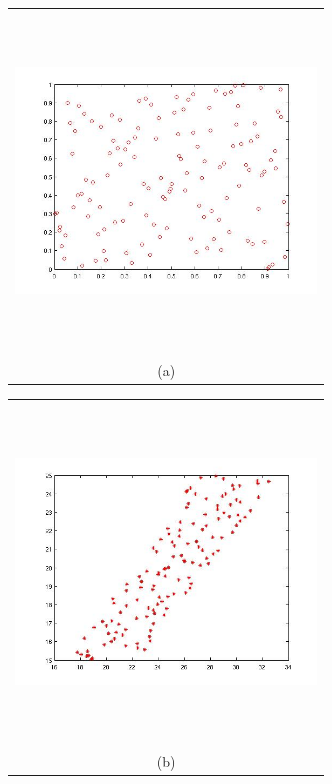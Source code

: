 \documentclass{article}
\newcommand{\Pic}[2][0.85]{\begin{center}\texttt{[image: \#2]}
 \end{center} }
\begin{document}
\begin{figure}[H]
      \begin{minipage}[b]{0.6\textwidth}
        \begin{tabular}{c}
       \includegraphics[width=8cm,height=9cm,keepaspectratio]{fig/lhs_b_128.jpg}\\
        (a)
        \end{tabular}
    \end{minipage}
      \begin{minipage}[b]{0.6\textwidth}
        \begin{tabular}{c}
       \includegraphics[width=8cm,height=9cm,keepaspectratio]{fig/lhs_a_128.jpg}\\
        (b)
        \end{tabular}

\end{minipage}
\end{figure}
\end{document}
